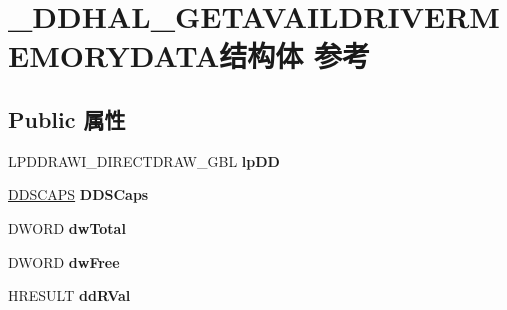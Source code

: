 \hypertarget{struct___d_d_h_a_l___g_e_t_a_v_a_i_l_d_r_i_v_e_r_m_e_m_o_r_y_d_a_t_a}{}\section{\+\_\+\+D\+D\+H\+A\+L\+\_\+\+G\+E\+T\+A\+V\+A\+I\+L\+D\+R\+I\+V\+E\+R\+M\+E\+M\+O\+R\+Y\+D\+A\+T\+A结构体 参考}
\label{struct___d_d_h_a_l___g_e_t_a_v_a_i_l_d_r_i_v_e_r_m_e_m_o_r_y_d_a_t_a}
\subsection*{Public 属性}
\begin{DoxyCompactItemize}
\item 
\mbox{\label{struct___d_d_h_a_l___g_e_t_a_v_a_i_l_d_r_i_v_e_r_m_e_m_o_r_y_d_a_t_a_a51a6620d6dc14979cc32786295443631}} 
L\+P\+D\+D\+R\+A\+W\+I\+\_\+\+D\+I\+R\+E\+C\+T\+D\+R\+A\+W\+\_\+\+G\+BL {\bfseries lp\+DD}
\item 
\mbox{\label{struct___d_d_h_a_l___g_e_t_a_v_a_i_l_d_r_i_v_e_r_m_e_m_o_r_y_d_a_t_a_a9ae012865ff1ac737b3a7d4946b08217}} 
\hyperlink{struct___d_d_s_c_a_p_s}{D\+D\+S\+C\+A\+PS} {\bfseries D\+D\+S\+Caps}
\item 
\mbox{\label{struct___d_d_h_a_l___g_e_t_a_v_a_i_l_d_r_i_v_e_r_m_e_m_o_r_y_d_a_t_a_a88cf1dfc6ac7f74073a58235c838903e}} 
D\+W\+O\+RD {\bfseries dw\+Total}
\item 
\mbox{\label{struct___d_d_h_a_l___g_e_t_a_v_a_i_l_d_r_i_v_e_r_m_e_m_o_r_y_d_a_t_a_a210b82b1047eaa2d4dddcce732177196}} 
D\+W\+O\+RD {\bfseries dw\+Free}
\item 
\mbox{\label{struct___d_d_h_a_l___g_e_t_a_v_a_i_l_d_r_i_v_e_r_m_e_m_o_r_y_d_a_t_a_a26d04e5aec331033400a0f7d0e513fa8}} 
H\+R\+E\+S\+U\+LT {\bfseries dd\+R\+Val}
\item 

\end{DoxyCompactItemize}
